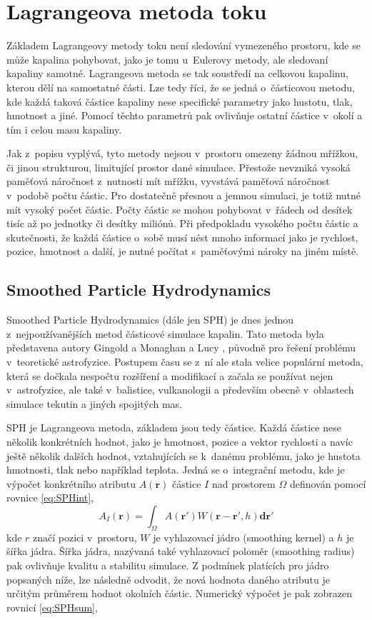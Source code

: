\section{Lagrangeova metoda toku}
Základem Lagrangeovy metody toku není sledování vymezeného prostoru, kde se může kapalina pohybovat, jako je tomu u~Eulerovy metody, ale sledovaní kapaliny samotné. Lagrangeova metoda se tak soustředí na celkovou kapalinu, kterou dělí na samostatné části. Lze tedy říci, že se jedná o~částicovou metodu, kde každá taková částice kapaliny nese specifické parametry jako hustotu, tlak, hmotnost a jiné. Pomocí těchto parametrů pak ovlivňuje ostatní částice v~okolí a tím i celou masu kapaliny.

Jak z~popisu vyplývá, tyto metody nejsou v~prostoru omezeny žádnou mřížkou, či jinou strukturou, limitující prostor dané simulace. Přestože nevzniká vysoká paměťová náročnost z~nutnosti mít mřížku, vyvstává paměťová náročnost v~podobě počtu částic. Pro dostatečně přesnou a jemnou simulaci, je totiž nutné mít vysoký počet částic. Počty částic se mohou pohybovat v~řádech od desítek tisíc až po jednotky či desítky miliónů. Při předpokladu  vysokého počtu částic a skutečnosti, že každá částice o~sobě musí nést mnoho informací jako je rychlost, pozice, hmotnost a další, je nutné počítat s~paměťovými nároky na jiném místě.

\subsection{Smoothed Particle Hydrodynamics}
\label{chapter:SPH}
Smoothed Particle Hydrodynamics (dále jen SPH) je dnes jednou z~nejpoužívanějších metod částicové simulace kapalin. Tato metoda byla představena autory Gingold a Monaghan \cite{Monaghan77} a Lucy \cite{Lucy77}, původně pro řešení problému v~teoretické astrofyzice. Postupem času se z~ní ale stala velice populární metoda, která se dočkala nespočtu rozšíření a modifikací a začala se používat nejen v~astrofyzice, ale také v~balistice, vulkanologii a především obecně v~oblastech simulace tekutin a jiných spojitých mas.

SPH je Lagrangeova metoda, základem jsou tedy částice. Každá částice nese několik konkrétních hodnot, jako je hmotnost, pozice a vektor rychlosti a navíc ještě několik dalších hodnot, vztahujících se k~danému problému, jako je hustota hmotnosti, tlak nebo například teplota. Jedná se o~integrační metodu, kde je výpočet konkrétního atributu $A(\mathbf{r})$ částice $I$ nad prostorem $\Omega$ definován pomocí rovnice \ref{eq:SPHint},
\begin{equation}
	A_I(\mathbf{r}) = \int_\Omega A(\mathbf{r}')W(\mathbf{r} - \mathbf{r'},h)\mathbf{dr}'
	\label{eq:SPHint}
\end{equation}
kde $r$ značí pozici v~prostoru, $W$ je vyhlazovací jádro (smoothing kernel) a $h$ je šířka jádra. Šířka jádra, nazývaná také vyhlazovací poloměr (smoothing radius) pak ovlivňuje kvalitu a stabilitu simulace. Z podmínek platících pro jádro popsaných níže, lze následně odvodit, že nová hodnota daného atributu je určitým průměrem hodnot okolních částic.
Numerický výpočet je pak zobrazen rovnicí \ref{eq:SPHsum},

